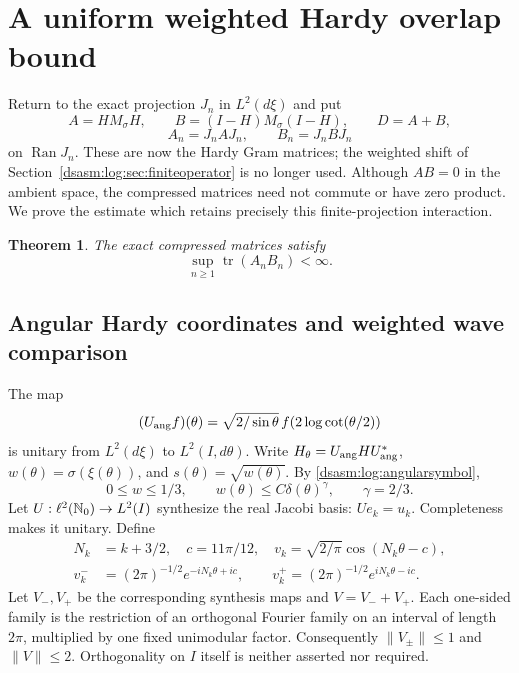 \documentclass[11pt,letterpaper]{article}
\newtheorem{theorem}{Theorem}[section]
\theoremstyle{remark}\newtheorem{remark}[theorem]{Remark}
\DeclareMathOperator{\tr}{tr}\DeclareMathOperator{\Ran}{Ran}
\begin{document}
\section{A uniform weighted Hardy overlap bound}
\label{dsasm:log:sec:overlap}
Return to the exact projection $J_n$ in $L^2(d\xi)$ and put
\begin{equation}\label{dsasm:log:ABdefs}
 A=HM_\sigma H,\qquad B=(I-H)M_\sigma(I-H),\qquad D=A+B,
\end{equation}
\[
 A_n=J_nAJ_n,\qquad B_n=J_nBJ_n
\]
on $\Ran J_n$. These are now the Hardy Gram matrices; the weighted
shift of Section~\ref{dsasm:log:sec:finiteoperator} is no longer used.
Although $AB=0$ in the ambient space, the compressed matrices need
not commute or have zero product. We prove the estimate which
retains precisely this finite-projection interaction.

\begin{theorem}\label{dsasm:log:overlaptheorem}
The exact compressed matrices satisfy
\begin{equation}\label{dsasm:log:overlapbound}
 \sup_{n\ge1}\tr(A_nB_n)<\infty.
\end{equation}
\end{theorem}

\subsection{Angular Hardy coordinates and weighted wave comparison}
The map
\[
 (U_{\rm ang}f)(\theta)=\sqrt{2/\sin\theta}\,
           f(2\log\cot(\theta/2))
\]
is unitary from $L^2(d\xi)$ to $L^2(I,d\theta)$.
Write $H_\theta=U_{\rm ang}HU_{\rm ang}^*$,
$w(\theta)=\sigma(\xi(\theta))$, and $s(\theta)=\sqrt{w(\theta)}$.
By \eqref{dsasm:log:angularsymbol},
\begin{equation}\label{dsasm:log:weightdecay}
 0\le w\le1/3,\qquad w(\theta)\le C\delta(\theta)^\gamma,
 \qquad \gamma=2/3.
\end{equation}
Let $U:\ell^2(\mathbb N_0)\to L^2(I)$ synthesize the real Jacobi basis:
$Ue_k=u_k$. Completeness makes it unitary. Define
\begin{equation}\label{dsasm:log:waves}
\begin{split}
 N_k&=k+3/2,\quad c=11\pi/12,\quad
 v_k=\sqrt{2/\pi}\cos(N_k\theta-c),\\
 v_k^-&=(2\pi)^{-1/2}e^{-iN_k\theta+ic},\qquad
 v_k^+=(2\pi)^{-1/2}e^{iN_k\theta-ic}.
\end{split}
\end{equation}
Let $V_-,V_+$ be the corresponding synthesis maps and $V=V_-+V_+$.
Each one-sided family is the restriction of an orthogonal Fourier
family on an interval of length $2\pi$, multiplied by one fixed
unimodular factor. Consequently $\|V_\pm\|\le1$ and $\|V\|\le2$.
Orthogonality on $I$ itself is neither asserted nor required.
\end{document}
